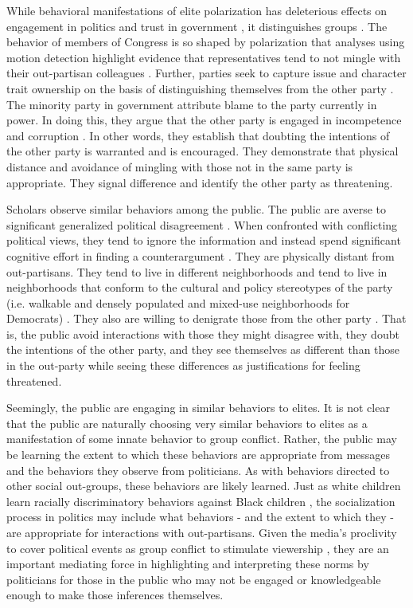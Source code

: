 \documentclass [12pt]{article}
\begin{document}
While behavioral manifestations of elite polarization has deleterious effects on engagement in politics and trust in government \citep{mutz_reeves_2005}, it distinguishes groups \citep{groenendyk_2018}. The behavior of members of Congress is so shaped by polarization that analyses using motion detection highlight evidence that representatives tend to not mingle with their out-partisan colleagues \citep{dietrich_2021}. Further, parties seek to capture issue and character trait ownership on the basis of distinguishing themselves from the other party \citep{clifford_2020}. The minority party in government attribute blame to the party currently in power. In doing this, they argue that the other party is engaged in incompetence and corruption \citep{lee_2009}. In other words, they establish that doubting the intentions of the other party is warranted and is encouraged. They demonstrate that physical distance and avoidance of mingling with those not in the same party is appropriate. They signal difference and identify the other party as threatening.

Scholars observe similar behaviors among the public. The public are averse to significant generalized political disagreement \citep{klar_krupnikov_2016}. When confronted with conflicting political views, they tend to ignore the information and instead spend significant cognitive effort in finding a counterargument \citep{taber_lodge_2006}. They are physically distant from out-partisans. They tend to live in different neighborhoods and tend to live in neighborhoods that conform to the cultural and policy stereotypes of the party (i.e. walkable and densely populated and mixed-use neighborhoods for Democrats) \citep{liu_et-al_2019, lyons_utych_2021}. They also are willing to denigrate those from the other party \citep{iyengar_westwood_2015}. That is, the public avoid interactions with those they might disagree with, they doubt the intentions of the other party, and they see themselves as different than those in the out-party while seeing these differences as justifications for feeling threatened. 

Seemingly, the public are engaging in similar behaviors to elites. It is not clear that the public are naturally choosing very similar behaviors to elites as a manifestation of some innate behavior to group conflict. Rather, the public may be learning the extent to which these behaviors are appropriate from messages and the behaviors they observe from politicians. As with behaviors directed to other social out-groups, these behaviors are likely learned. Just as white children learn racially discriminatory behaviors against Black children \citep[see][]{sears_brown_2013}, the socialization process in politics may include what behaviors - and the extent to which they - are appropriate for interactions with out-partisans. Given the media's proclivity to cover political events as group conflict to stimulate viewership \citep{baum_jamieson_2006}, they are an important mediating force in highlighting and interpreting these norms by politicians for those in the public who may not be engaged or knowledgeable enough to make those inferences themselves.
\end{document}
